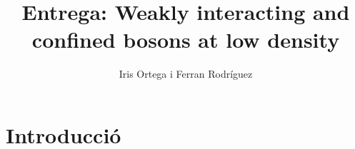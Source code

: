 \documentclass[a4paper]{article}
\title{Entrega: Weakly interacting and confined bosons at low density}
\author{Iris Ortega i Ferran Rodríguez}
\begin{document}
\maketitle{}






\section{\bf Introducció}
\end{document}
